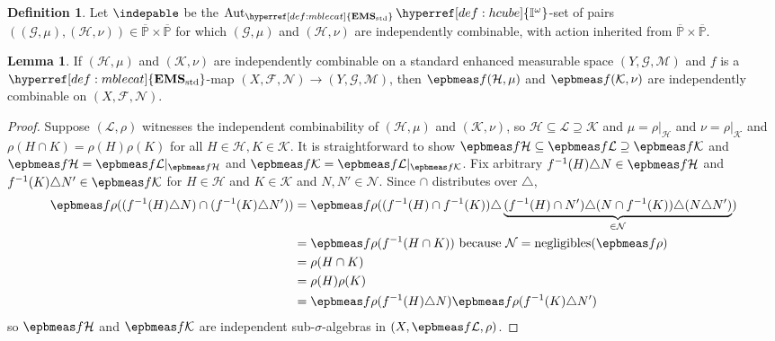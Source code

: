 \documentclass[
  sigconf,
  screen, ]{acmart}
\theoremstyle{definition}
\newtheorem{lemma}[theorem]{Lemma}
\newtheorem{definition}[theorem]{Definition}
\newcommand\Aut{\operatorname{Aut}}
\newcommand\calF{\mathcal F}
\newcommand\calG{\mathcal G}
\newcommand\calH{\mathcal H}
\newcommand\calK{\mathcal K}
\newcommand\calL{\mathcal L}
\newcommand\calM{\mathcal M}
\newcommand\calN{\mathcal N}
\newcommand\nref[2]{\hyperref[#1]{#2}} \newcommand\checkhigh{{\huge{\color{red}\textbf{TODO: check}}}}
\newcommand\negligibles{\mathrm{negligibles}}
\newcommand\texhcube{{{{\mathbb I}^\omega}}}
\newcommand\hcube{{\nref{def:hcube}{\texhcube}}}
\newcommand\texStdMble{\mathbf{EMS}_{\rm std}}
\newcommand\StdMble{{\nref{def:mblecat}{\texStdMble}}}
\newcommand\preauti{{{\Aut_\StdMble\hcube}}}
\newcommand\texgpspcs{\overline{\mathbb P}}
\newcommand\gpspcs{{\nref{def:gpspcs}{\texgpspcs}}}
\begin{document}
\begin{definition} \label{app:def:indepable}
  Let $\indepable$ be the $\preauti$-set
  of pairs $((\calG,\mu),(\calH,\nu))\in\gpspcs\times\gpspcs$
  for which $(\calG,\mu)$ and $(\calH,\nu)$
  are independently combinable,
  with action inherited from $\gpspcs\times\gpspcs$.
\end{definition}

\begin{lemma} \label{app:lem:indepcomb-pbstable}
  If $(\calH,\mu)$ and $(\calK,\nu)$
  are independently combinable on
  a standard enhanced measurable space $(Y,\calG,\calM)$
  and 
  $f$ is a $\StdMble$-map $(X,\calF,\calN)\to(Y,\calG,\calM)$,
  then $\epbmeas f(\calH,\mu)$
  and $\epbmeas f(\calK,\nu)$
  are independently combinable on $(X,\calF,\calN)$.
\end{lemma}
\begin{proof}
  Suppose $(\calL,\rho)$ witnesses
  the independent combinability of 
  $(\calH,\mu)$ and $(\calK,\nu)$,
  so $\calH\subseteq\calL\supseteq\calK$
  and $\mu=\rho|_\calH$ and $\nu=\rho|_\calK$
  and $\rho(H\cap K)=\rho(H)\rho(K)$
  for all $H\in\calH,K\in\calK$.
  It is straightforward to show
  $\epbmeas f\calH\subseteq\epbmeas f\calL\supseteq\epbmeas f\calK$
  and $\epbmeas f\calH = \epbmeas f\calL|_{\epbmeas f\calH}$
  and $\epbmeas f\calK = \epbmeas f\calL|_{\epbmeas f\calK}$.
  Fix arbitrary $f^{-1}(H)\triangle N\in\epbmeas f\calH$
  and $f^{-1}(K)\triangle N'\in\epbmeas f{\calK}$
  for $H\in\calH$ and $K\in\calK$ and $N,N'\in\calN$.
  Since $\cap$ distributes over $\triangle$,
  \begin{align*} 
    \epbmeas f\rho((f^{-1}(H)\triangle N)\cap(f^{-1}(K)\triangle N'))
    &= 
    \epbmeas f\rho(
      (f^{-1}(H)\cap f^{-1}(K))\triangle
      \underbrace{(f^{-1}(H)\cap N')\triangle
      (N\cap f^{-1}(K))\triangle
      (N\triangle N')}_{\in\calN}
    )\\
    &= \epbmeas f\rho(f^{-1}(H\cap K))
      \text{ because $\calN = \negligibles(\epbmeas f\rho)$}
      \\
    &= \rho(H\cap K)\\
    &= \rho(H)\rho(K)\\
    &= \epbmeas f\rho(f^{-1}(H)\triangle N)
       \epbmeas f\rho(f^{-1}(K)\triangle N')
  \end{align*}
  so $\epbmeas f\calH$ and $\epbmeas f\calK$
  are independent sub-$\sigma$-algebras in $(X,\epbmeas f\calL,\rho)$.
\end{proof}
\end{document}
